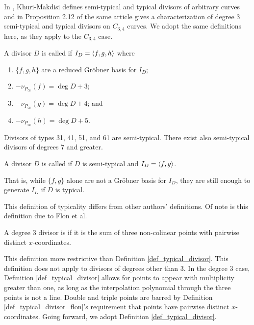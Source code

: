 In \cite{kmakdisi18}, Khuri-Makdisi defines semi-typical and typical divisors of arbitrary curves
and in Proposition 2.12 of the same article gives a characterization of degree 3
semi-typical and typical divisors on $C_{3,4}$ curves.
We adopt the same definitions here, as they apply to the $C_{3,4}$ case.
\begin{definition}
  \label{def_semitypical_divisor}
  A divisor $D$ is called  if $I_D = \left\langle f, g, h \right\rangle$ where
  \begin{enumerate}[label=(\roman*)]
    \item $\{f, g, h\}$ are a reduced Gr\"obner basis for $I_D$;
    \item $-\nu_{P_\infty}(f) = \deg D + 3$;
    \item $-\nu_{P_\infty}(g) = \deg D + 4$; and
    \item $-\nu_{P_\infty}(h) = \deg D + 5$.
  \end{enumerate}
\end{definition}
Divisors of types 31, 41, 51, and 61 are semi-typical.
There exist also semi-typical divisors of degrees 7 and greater.
\begin{definition}
  \label{def_typical_divisor}
  A divisor $D$ is called  if $D$ is semi-typical and $I_D = \left\langle f, g \right\rangle$.
\end{definition}
That is, while $\{f, g\}$ alone are not a Gr\"obner basis for $I_D$,
they are still enough to generate $I_D$ if $D$ is typical.

This definition of typicality differs from other authors' definitions.
Of note is this definition due to Flon et al.
\begin{definition}
  \label{def_typical_divisor_flon}
  A degree 3 divisor is  if it is the sum of three non-colinear points
  with pairwise distinct $x$-coordinates.
\end{definition}
This definition more restrictive than Definition \ref{def_typical_divisor}.
This definition does not apply to divisors of degrees other than 3.
In the degree 3 case, Definition \ref{def_typical_divisor} allows for points to appear with multiplicity
greater than one, as long as the interpolation polynomial through the three points is not a line.
Double and triple points are barred by Definition \ref{def_typical_divisor_flon}'s requirement that
points have pairwise distinct $x$-coordinates.
Going forward, we adopt Definition \ref{def_typical_divisor}.

